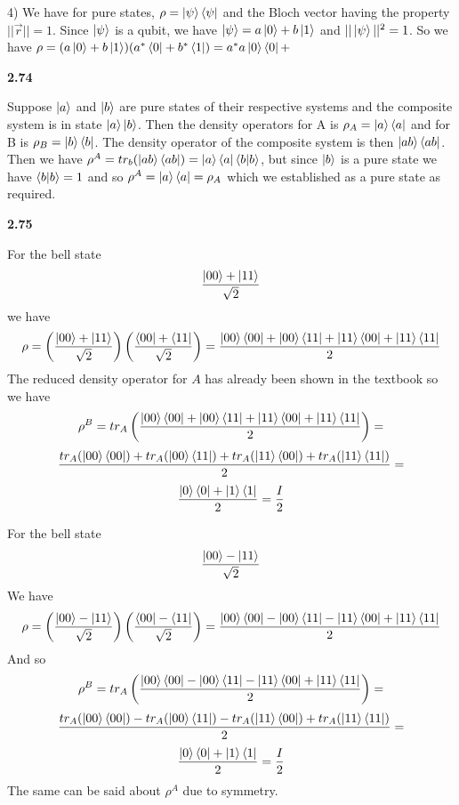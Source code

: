 4) We have for pure states, $\rho = \ket{\psi}\bra{\psi}$ and the Bloch vector having the property $ ||\vec{r}|| = 1$. Since $\ket{\psi}$ is a qubit, we have $\ket{\psi} = a\ket{0}+ b\ket{1}$ and $ ||\ket{\psi}||^2 = 1$. So we have $ \rho = (a\ket{0}+ b\ket{1})(a^*\bra{0}+ b^*\bra{1})  = a^*a\ket{0}\bra{0} + $

\textbf{2.74}

Suppose $ \ket{a}$ and $\ket{b}$ are pure states of their respective systems and the composite system is in state $\ket{a}\ket{b}$. Then the density operators for A is $\rho_A = \ket{a}\bra{a}$ and for B is $\rho_B = \ket{b}\bra{b}$. The density operator of the composite system is then $ \ket{ab} \bra{ab}$. Then we have $\rho^A = tr_b(\ket{ab} \bra{ab}) = \ket{a}\bra{a}\braket{b|b}$, but since $\ket{b} $ is a pure state we have $ \braket{b|b} = 1$ and so $ \rho^A=\ket{a}\bra{a} = \rho_A$ which we established as a pure state as required.

\textbf{2.75}

For the bell state
\[\frac{\ket{00} + \ket{11}}{\sqrt{2}}\]
we have 
\[\rho = \left(\frac{\ket{00} + \ket{11}}{\sqrt{2}}\right)\left(\frac{\bra{00} + \bra{11}}{\sqrt{2}}\right) = \frac{\ket{00}\bra{00} + \ket{00}\bra{11} + \ket{11}\bra{00} + \ket{11}\bra{11}}{2}\]
The reduced density operator for $A$ has already been shown in the textbook so we have
\[\rho^B = tr_A\left(\frac{\ket{00}\bra{00} + \ket{00}\bra{11} + \ket{11}\bra{00} + \ket{11}\bra{11}}{2}\right) =\]\[\frac{tr_A(\ket{00}\bra{00}) + tr_A(\ket{00}\bra{11}) + tr_A(\ket{11}\bra{00}) + tr_A(\ket{11}\bra{11})}{2} =\]\[ \frac{\ket{0}\bra{0} + \ket{1}\bra{1}}{2} =\frac{I}{2} \]

For the bell state
\[\frac{\ket{00} - \ket{11}}{\sqrt{2}}\]
We have 
\[\rho = \left(\frac{\ket{00} - \ket{11}}{\sqrt{2}}\right)\left(\frac{\bra{00} - \bra{11}}{\sqrt{2}}\right) = \frac{\ket{00}\bra{00} - \ket{00}\bra{11} - \ket{11}\bra{00} + \ket{11}\bra{11}}{2}\]
And so 
\[\rho^B = tr_A\left(\frac{\ket{00}\bra{00} - \ket{00}\bra{11} - \ket{11}\bra{00} + \ket{11}\bra{11}}{2}\right) =\]\[\frac{tr_A(\ket{00}\bra{00}) - tr_A(\ket{00}\bra{11}) - tr_A(\ket{11}\bra{00}) + tr_A(\ket{11}\bra{11})}{2} =\]\[ \frac{\ket{0}\bra{0} + \ket{1}\bra{1}}{2} =\frac{I}{2}\]
The same can be said about $\rho^A$ due to symmetry.